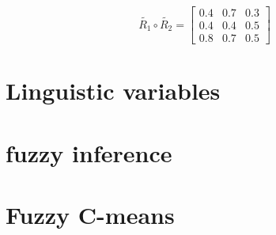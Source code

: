 \documentclass[10pt,a4paper]{article}
\begin{document}
\[
\tilde{R_{1}} \circ \tilde{R_{2}} = 
\begin{bmatrix}
0.4 & 0.7 & 0.3 \\
0.4 & 0.4 & 0.5 \\
0.8 & 0.7 & 0.5
\end{bmatrix}
\]



\section{Linguistic variables}







\section{fuzzy inference}







\section{Fuzzy C-means}
\end{document}
